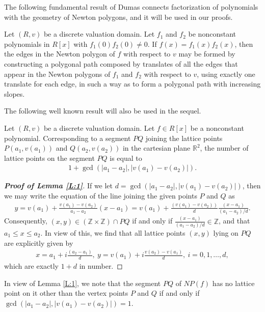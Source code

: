 \documentclass[12pt]{amsart}%
\begin{document}
The following fundamental result of Dumas connects factorization of polynomials with the geometry of Newton polygons, and it will be used in our proofs.
\begin{thmx}\label{th:B}
Let $(R,v)$ be a discrete valuation domain. Let $f_1$ and $f_2$ be nonconstant polynomials in ${R}[x]$ with $f_1(0)f_2(0)\neq 0$. If $f(x)=f_1(x)f_2(x)$, then the edges in the Newton polygon  of $f$ with respect to $v$ may be formed by constructing a polygonal path composed by translates of all the edges that appear
in the Newton polygons of $f_1$ and $f_2$ with respect to $v$, using
exactly one translate for each edge, in such a way as to form a
polygonal path with increasing slopes.
\end{thmx}
The following well known result will also be used in the sequel.
\begin{lemma}\label{L:1}
Let $(R,v)$ be a discrete valuation domain. Let $f\in R[x]$ be a nonconstant polynomial. Corresponding to a segment $PQ$ joining the lattice points $P(a_1,v(a_1))$ and $Q(a_2,v(a_2))$ in the cartesian plane $\mathbb{R}^2$, the number of lattice points on the segment $PQ$ is equal to
\begin{eqnarray*}
1+\gcd(|a_1-a_2|, |v(a_1)-v(a_2)|).
\end{eqnarray*}
\end{lemma}
\begin{proof}[\bf Proof of Lemma \ref{L:1}] If we let $d=\gcd(|a_1-a_2|, |v(a_1)-v(a_2)|)$, then we may write
the  equation of the line joining the given points $P$ and $Q$ as
 \begin{eqnarray*}
 y=v(a_1)+\frac{v(a_1)-v(a_2)}{a_1-a_2}(x-a_1)=v(a_1)+\frac{(v(a_1)-v(a_2))}{d}\frac{(x-a_1)}{(a_1-a_2)/d}.
 \end{eqnarray*}
 Consequently, $(x,y)\in (\mathbb{Z}\times \mathbb{Z})\cap PQ$ if and only if $\frac{(x-a_1)}{(a_1-a_2)/d}\in \mathbb{Z}$, and that $a_1\leq x\leq a_2$. In view of this, we find that all lattice points $(x,y)$ lying on $PQ$ are explicitly given by
 \begin{eqnarray*}
 x=a_1+i\frac{(a_2-a_1)}{d},~y=v(a_1)+i\frac{v(a_2)-v(a_1)}{d},~i=0,1,\ldots,d,
  \end{eqnarray*}
  which are exactly $1+d$ in number.
\end{proof}
In view of Lemma \ref{L:1}, we note that the segment $PQ$ of $NP(f)$ has no lattice point on it other than the vertex points $P$ and $Q$ if and only if $\gcd(|a_1-a_2|, |v(a_1)-v(a_2)|)=1$.
\end{document}
